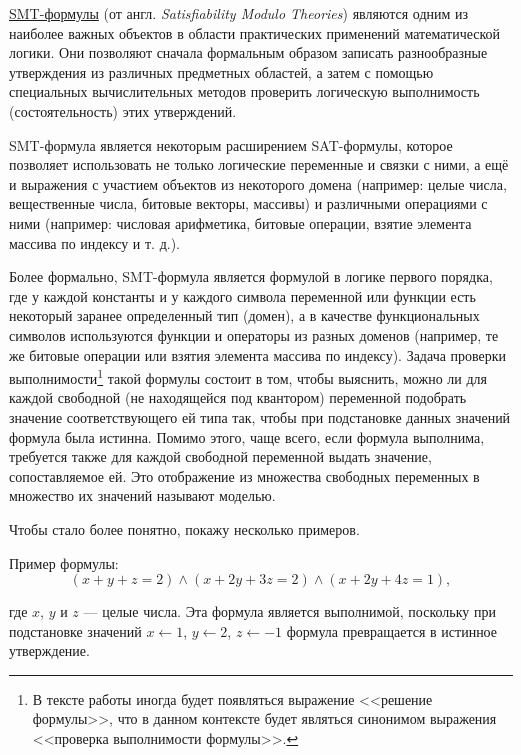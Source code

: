 

\underline{SMT-формулы} (от англ. \textit{Satisfiability Modulo Theories}) являются одним из наиболее важных объектов в области практических применений математической логики. Они позволяют сначала формальным образом записать разнообразные утверждения из различных предметных областей, а затем с помощью специальных вычислительных методов проверить логическую выполнимость (состоятельность) этих утверждений.

SMT-формула является некоторым расширением SAT-формулы, которое позволяет использовать не только логические переменные и связки с ними, а ещё и выражения с участием объектов из некоторого домена (например: целые числа, вещественные числа, битовые векторы, массивы) и различными операциями с ними (например: числовая арифметика, битовые операции, взятие элемента массива по индексу и т. д.).

Более формально, SMT-формула является формулой в логике первого порядка, где у каждой константы и у каждого символа переменной или функции есть некоторый заранее определенный тип (домен), а в качестве функциональных символов используются функции и операторы из разных доменов (например, те же битовые операции или взятия элемента массива по индексу). Задача проверки выполнимости\footnote{В тексте работы иногда будет появляться выражение <<решение формулы>>, что в данном контексте будет являться синонимом выражения <<проверка выполнимости формулы>>.} такой формулы состоит в том, чтобы выяснить, можно ли для каждой свободной (не находящейся под квантором) переменной подобрать значение соответствующего ей типа так, чтобы при подстановке данных значений формула была истинна. Помимо этого, чаще всего, если формула выполнима, требуется также для каждой свободной переменной выдать значение, сопоставляемое ей. Это отображение из множества свободных переменных в множество их значений называют моделью.

Чтобы стало более понятно, покажу несколько примеров.

Пример формулы:
\begin{equation} \label{smt-example-1}
    (x + y + z = 2) \wedge (x + 2y + 3z = 2) \wedge (x + 2y + 4z = 1),
\end{equation}

где $x$, $y$ и $z$ --- целые числа. Эта формула является выполнимой, поскольку при подстановке значений $x \leftarrow 1$, $y \leftarrow 2$, $z \leftarrow -1$ формула превращается в истинное утверждение.

